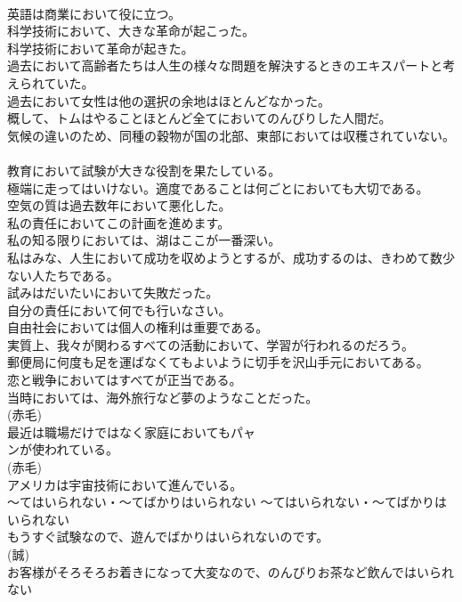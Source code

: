 \documentclass[8pt]{extreport}
\begin{document}
\begin{CJK}{UTF8}{min}
\\	英語は商業において役に立つ。   
\\	科学技術において、大きな革命が起こった。   
\\	科学技術において革命が起きた。   
\\	過去において高齢者たちは人生の様々な問題を解決するときのエキスパートと考えられていた。   
\\	過去において女性は他の選択の余地はほとんどなかった。   
\\	概して、トムはやることほとんど全てにおいてのんびりした人間だ。   
\\	気候の違いのため、同種の穀物が国の北部、東部においては収穫されていない。   
\\	教育において試験が大きな役割を果たしている。   
\\	極端に走ってはいけない。適度であることは何ごとにおいても大切である。   
\\	空気の質は過去数年において悪化した。   
\\	私の責任においてこの計画を進めます。   
\\	私の知る限りにおいては、湖はここが一番深い。   
\\	私はみな、人生において成功を収めようとするが、成功するのは、きわめて数少ない人たちである。   
\\	試みはだいたいにおいて失敗だった。   
\\	自分の責任において何でも行いなさい。   
\\	自由社会においては個人の権利は重要である。   
\\	実質上、我々が関わるすべての活動において、学習が行われるのだろう。   
\\	郵便局に何度も足を運ばなくてもよいように切手を沢山手元においてある。   
\\	恋と戦争においてはすべてが正当である。   
\\	当時においては、海外旅行など夢のようなことだった。  
\\	(赤毛)
\\	最近は職場だけではなく家庭においてもパャ
\\	ンが使われている。  
\\	(赤毛)
\\	アメリカは宇宙技術において進んでいる。  
\\	〜てはいられない・〜てばかりはいられない	〜てはいられない・〜てばかりはいられない	
\\	もうすぐ試験なので、遊んでばかりはいられないのです。  
\\	(誠)
\\	お客様がそろそろお着きになって大変なので、のんびりお茶など飲んではいられない  

\end{CJK}
\end{document}
